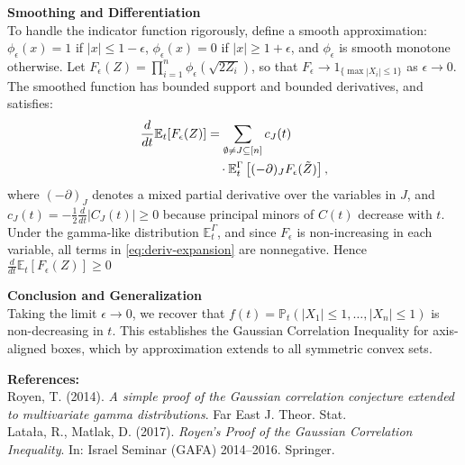 \begin{technical}
\noindent\textbf{Smoothing and Differentiation}\\
To handle the indicator function rigorously, define a smooth approximation:
$\phi_\epsilon(x) = 1$ if $|x| \le 1 - \epsilon$, $\phi_\epsilon(x) = 0$ if $|x| \ge 1 + \epsilon$, and $\phi_\epsilon$ is smooth monotone otherwise.
Let $F_\epsilon(Z) = \prod_{i=1}^n \phi_\epsilon\left(\sqrt{2Z_i}\right)$, so that \( F_\epsilon \to 1_{\{\max |X_i| \le 1\}} \) as \( \epsilon \to 0 \). The smoothed function has bounded support and bounded derivatives, and satisfies:
\begin{align}
\frac{d}{dt} \mathbb{E}_t[F_\epsilon(Z)] 
&= \sum_{\emptyset \neq J \subseteq [n]} c_J(t) \notag \\
&\quad \cdot \mathbb{E}^{\Gamma}_t \left[ (-\partial)_J F_\epsilon(\tilde Z) \right], \label{eq:deriv-expansion}
\end{align}
where \( (-\partial)_J \) denotes a mixed partial derivative over the variables in \( J \), and \( c_J(t) = -\frac{1}{2} \frac{d}{dt} |C_J(t)| \ge 0 \) because principal minors of \( C(t) \) decrease with \( t \). Under the gamma-like distribution \( \mathbb{E}^\Gamma_t \), and since \( F_\epsilon \) is non-increasing in each variable, all terms in \eqref{eq:deriv-expansion} are nonnegative. Hence $\frac{d}{dt} \mathbb{E}_t[F_\epsilon(Z)] \ge 0$

\noindent\textbf{Conclusion and Generalization}\\
Taking the limit \( \epsilon \to 0 \), we recover that $f(t) = \mathbb{P}_t\left( |X_1| \le 1, \dots, |X_n| \le 1 \right)$ is non-decreasing in $t$. This establishes the Gaussian Correlation Inequality for axis-aligned boxes, which by approximation extends to all symmetric convex sets.

\noindent\textbf{References:}\\
Royen, T. (2014). \textit{A simple proof of the Gaussian correlation conjecture extended to multivariate gamma distributions}. Far East J. Theor. Stat.\\
Latała, R., Matlak, D. (2017). \textit{Royen’s Proof of the Gaussian Correlation Inequality}. In: Israel Seminar (GAFA) 2014–2016. Springer.
\end{technical}
